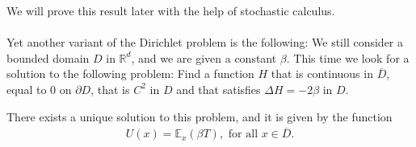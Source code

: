 \documentclass[../mainfile.tex]{subfiles}
\begin{document}
We will prove this result later with the help of stochastic calculus.
\\\\
Yet another variant of the Dirichlet problem is the following: We still consider a bounded domain $D$ in $\mathbb{R}^d$, and we are given a constant $\beta$. This time we look for a solution to the following problem: Find a function $H$ that is continuous in $\overline{D}$, equal to $0$ on $\partial D$, that is $C^2$ in $D$ and that satisfies $\Delta H = - 2 \beta$ in $D.$
\begin{prop} There exists a unique solution to this problem, and it is given by the function
\begin{align*}
U(x)= \mathbb{E}_x( \beta T), \text{ for all } x \in \overline{D}. 
\end{align*}
\end{prop}
\end{document}
